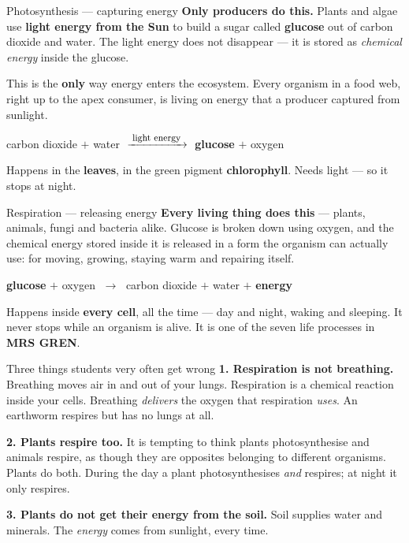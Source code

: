 \documentclass[11pt,a4paper]{article}
\begin{document}
\begin{infobox}{Photosynthesis --- capturing energy}
\textbf{Only producers do this.} Plants and algae use \textbf{light energy from the Sun} to build a sugar called \textbf{glucose} out of carbon dioxide and water. The light energy does not disappear --- it is stored as \emph{chemical energy} inside the glucose.

\medskip
\noindent This is the \textbf{only} way energy enters the ecosystem. Every organism in a food web, right up to the apex consumer, is living on energy that a producer captured from sunlight.

\medskip
\begin{center}
\small
carbon dioxide $+$ water $\;\xrightarrow{\;\text{\footnotesize light energy}\;}\;$ \textbf{glucose} $+$ oxygen
\end{center}

\medskip
\noindent Happens in the \textbf{leaves}, in the green pigment \textbf{chlorophyll}. Needs light --- so it stops at night.
\end{infobox}

\begin{infobox}{Respiration --- releasing energy}
\textbf{Every living thing does this} --- plants, animals, fungi and bacteria alike. Glucose is broken down using oxygen, and the chemical energy stored inside it is released in a form the organism can actually use: for moving, growing, staying warm and repairing itself.

\medskip
\begin{center}
\small
\textbf{glucose} $+$ oxygen $\;\longrightarrow\;$ carbon dioxide $+$ water $+$ \textbf{energy}
\end{center}

\medskip
\noindent Happens inside \textbf{every cell}, all the time --- day and night, waking and sleeping. It never stops while an organism is alive. It is one of the seven life processes in \textbf{MRS GREN}.
\end{infobox}

\begin{scaffold}{Three things students very often get wrong}
\textbf{1. Respiration is not breathing.} Breathing moves air in and out of your lungs. Respiration is a chemical reaction inside your cells. Breathing \emph{delivers} the oxygen that respiration \emph{uses}. An earthworm respires but has no lungs at all.

\medskip
\textbf{2. Plants respire too.} It is tempting to think plants photosynthesise and animals respire, as though they are opposites belonging to different organisms. Plants do both. During the day a plant photosynthesises \emph{and} respires; at night it only respires.

\medskip
\textbf{3. Plants do not get their energy from the soil.} Soil supplies water and minerals. The \emph{energy} comes from sunlight, every time.
\end{scaffold}
\end{document}
